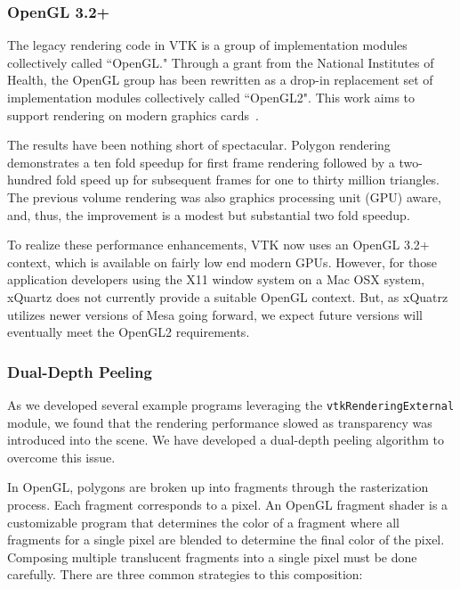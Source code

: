 \subsubsection{OpenGL 3.2+}

The legacy rendering code in VTK is a group of implementation modules collectively called ``OpenGL."
Through a grant from the National Institutes of Health, the OpenGL group has
been rewritten as a drop-in replacement set of implementation modules
collectively called ``OpenGL2".
This work aims to support rendering on modern graphics cards~\cite{Hanwell:2015}.

The results have been nothing short of spectacular.
Polygon rendering demonstrates a ten fold speedup for first frame rendering followed by a two-hundred fold speed up for subsequent frames for one to thirty million triangles.
The previous volume rendering was also graphics processing unit (GPU) aware, and, thus, the improvement is a modest but substantial two fold speedup. 

To realize these performance enhancements, VTK now uses an OpenGL 3.2+ context, which is available on fairly low end modern GPUs.
However, for those application developers using the X11 window system on a Mac OSX system, xQuartz does not currently provide a suitable OpenGL context.
But, as xQuatrz utilizes newer versions of Mesa going forward, we expect future versions will eventually meet the OpenGL2 requirements.

\subsubsection{Dual-Depth Peeling}

As we developed several example programs leveraging the \texttt{vtkRenderingExternal} module, we found that the rendering performance slowed as transparency was introduced into the scene. We have developed a dual-depth peeling algorithm to overcome this issue.

In OpenGL, polygons are broken up into fragments through the rasterization process.
Each fragment corresponds to a pixel.
An OpenGL fragment shader is a customizable program that determines the color of a fragment where all fragments for a single pixel are blended to determine the final color of the pixel.
Composing multiple translucent fragments into a single pixel must be done carefully.
There are three common strategies to this composition:

